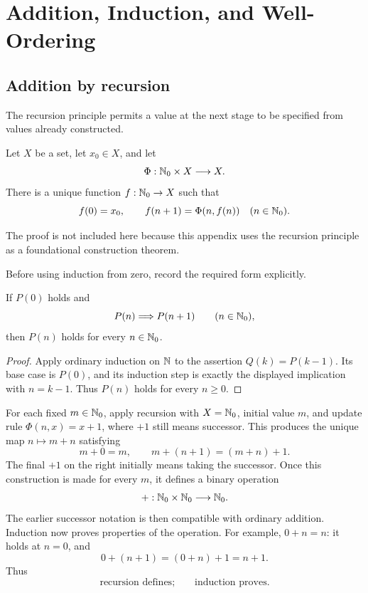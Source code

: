 \section{Addition, Induction, and Well-Ordering}
\subsection*{Addition by recursion}
The recursion principle permits a value at the next stage to be specified
from values already constructed.
\begin{theorem}
\label{thm:natural-recursion}
Let $X$ be a set, let $x_0\in X$, and let
\[
\Phi:\mathbb{N}_0\times X\longrightarrow X.
\]
There is a unique function $f:\mathbb{N}_0\to X$ such that
\[
f(0)=x_0,
\qquad
f(n+1)=\Phi(n,f(n))
\quad(n\in\mathbb{N}_0).
\]
\end{theorem}
The proof is not included here because this appendix uses the recursion
principle as a foundational construction theorem.

Before using induction from zero, record the required form explicitly.
\begin{proposition}[Induction on \(\N_0\)]
\label{prop:n-zero-induction}
If $P(0)$ holds and
\[
P(n)\Longrightarrow P(n+1)
\qquad(n\in\mathbb{N}_0),
\]
then $P(n)$ holds for every $n\in\mathbb{N}_0$.
\end{proposition}
\begin{proof}
Apply ordinary induction on \(\mathbb{N}\) to the assertion $Q(k)=P(k-1)$.
Its base case is $P(0)$, and its induction step is exactly the displayed
implication with $n=k-1$. Thus $P(n)$ holds for every $n\geq0$.
\end{proof}

For each fixed \(m\in\mathbb{N}_0\), apply recursion with $X=\mathbb{N}_0$, initial
value $m$, and update rule $\Phi(n,x)=x+1$, where $+1$ still means
successor. This produces the unique map $n\mapsto m+n$ satisfying
\[
m+0=m,
\qquad
m+(n+1)=(m+n)+1.
\]
The final \(+1\) on the right initially means taking the successor. Once
this construction is made for every $m$, it defines a binary operation
\[
+:\mathbb{N}_0\times\mathbb{N}_0\longrightarrow\mathbb{N}_0.
\]
The earlier successor notation is then compatible with ordinary addition.
Induction now proves properties of the operation. For example, \(0+n=n\):
it holds at \(n=0\), and
\[
0+(n+1)=(0+n)+1=n+1.
\]
Thus
\[
\boxed{\text{recursion defines;}\qquad\text{induction proves}.}
\]


